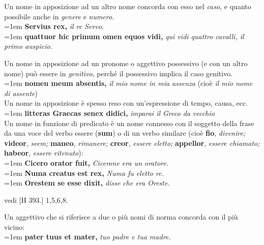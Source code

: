 \documentclass[nols]{tufte-handout}
\begin{document}
 Un nome in apposizione ad un altro nome concorda con esso nel \textit{caso}, e quanto possibile anche in \textit{genere} e \textit{numero}. 
\\
\vspace{0.5em}
\noindent \hangindent=1em \textbf{Servius rex,} \textit{il re Servo.} \\
\noindent \hangindent=1em \textbf{quattuor hic primum omen equos vidi,} \textit{qui vidi quattro cavalli, il primo auspicio.}

 Un nome in apposizione ad un pronome o aggettivo possessivo (e con un altro nome) può essere in \textit{genitivo}, perché il possessivo implica il caso genitivo.
\\
\vspace{0.5em}
\noindent \hangindent=1em \textbf{nomen meum absentis,} \textit{il mio nome in mia assenza} (cioè \textit{il mio nome di assente})\\

 Un nome in apposizione è spesso reso con un'espressione di tempo, causa, ecc.
\\
\vspace{0.5em}
\noindent \hangindent=1em \textbf{litteras Graecas senex didici,} \textit{imparai il Greco da vecchio}\\
 
 Un nome in funzione di predicato è un nome connesso con il soggetto della frase da una voce del verbo essere (\textbf{sum})
o di un verbo similare (cioè \textbf{fio}, \textit{divenire;} 
\textbf{videor}, \textit{seem;} 
\textbf{maneo}, \textit{rimanere;} 
\textbf{creor}, \textit{essere eletto;}
\textbf{appellor}, \textit{essere chiamato;}
\textbf{habeor}, \textit{essere ritenuto}):
\\
\vspace{0.5em}
\noindent \hangindent=1em \textbf{Cicero orator fuit,} \textit{Cicerone era un oratore.}\\
\noindent \hangindent=1em \textbf{Numa creatus est rex,} \textit{Numa fu eletto re.}\\
\noindent \hangindent=1em \textbf{Orestem se esse dixit,} \textit{disse che era Oreste.}
 
 vedi [H 393.] 1,5,6,8.

 Un aggettivo che si riferisce a due o più nomi di norma concorda con il più vicino:
\\
\vspace{0.5em}
\noindent \hangindent=1em \textbf{pater tuus et mater,} \textit{tuo padre e tua madre.}
\end{document}

